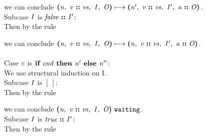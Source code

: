 \documentclass[12pt]{article}
\begin{document}
we can conclude
$\steps{
   \cfg{\nterm{n}}{\cons{\nterm{v}}{\nterm{vs}}}{\nterm{I}}{\nterm{O}}
 }{
   \cfg{\nterm{n'}}{\cons{\nterm{v}}{\nterm{vs}}}{\nterm{I'}}{\cons{\nterm{a}}{\nterm{O}}}
 }$.\\

Subcase $\nterm{I}$ is $\cons{\nterm{false}}{\nterm{I'}}$:\\

Then by the rule

\begin{mathpar}
\end{mathpar}

we can conclude
$\steps{
   \cfg{\nterm{n}}{\cons{\nterm{v}}{\nterm{vs}}}{\nterm{I}}{\nterm{O}}
 }{
   \cfg{\nterm{n}}{\cons{\nterm{v}}{\nterm{vs}}}{\nterm{I'}}{\cons{\nterm{a}}{\nterm{O}}}
 }$.\\
\\

Case $\nterm{c}$ is $\ifelse{\nterm{cnd}}{\nterm{n'}}{\nterm{n''}}$:\\

We use structural induction on I.\\

Subcase $\nterm{I}$ is $[\ ]$:\\

Then by the rule

\begin{mathpar}
\end{mathpar}

we can conclude
$\waiting{\cfg{\nterm{n}}{\cons{\nterm{v}}{\nterm{vs}}}{\nterm{I}}{\nterm{O}}}$.\\

Subcase $\nterm{I}$ is $\cons{\nterm{true}}{\nterm{I'}}$:\\

Then by the rule

\begin{mathpar}
\end{mathpar}
\end{document}
